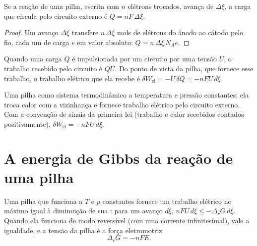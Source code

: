 \begin{proposition}\label{prop:b2:cell-thermodynamics:charge}
Se a reação de uma pilha, escrita com $n$ elétrons trocados, avança de
$\Delta\xi$, a carga que circula pelo circuito externo é $Q =
nF\,\Delta\xi$.
\end{proposition}

\begin{proof}
Um avanço $\Delta\xi$ transfere $n\,\Delta\xi$ mols de elétrons do ânodo ao
cátodo pelo fio, cada um de carga $e$ em valor absoluto:
$Q = n\,\Delta\xi\,N_A e$.
\end{proof}

Quando uma carga $Q$ é impulsionada por um circuito por uma tensão $U$, o
trabalho recebido pelo circuito é $QU$. Do ponto de vista da pilha, que
fornece esse trabalho, o trabalho elétrico que ela recebe é
$\delta W_{\text{el}} = -U\,\delta Q = -nFU\,
d\xi$.

\begin{omfigure}

{\small Uma pilha como sistema termodinâmico a temperatura e pressão
constantes: ela troca calor com a vizinhança e fornece trabalho elétrico pelo
circuito externo. Com a convenção de sinais da primeira lei (trabalho e calor
recebidos contados positivamente), $\delta W_{\text{el}} = -nFU\,d\xi$.}
\end{omfigure}

\section{A energia de Gibbs da reação de uma pilha}

\begin{theorem}\label{thm:b2:cell-thermodynamics:delta-g-nfe}
Uma pilha que funciona a $T$ e $p$ constantes fornece um trabalho elétrico no
máximo igual à diminuição de sua : para um avanço $d\xi$,
$nFU\,d\xi \leq -\Delta_r G\,d\xi$. Quando ela funciona de modo reversível
(com uma corrente infinitesimal), vale a igualdade, e a tensão da pilha é a
força eletromotriz
\[
  \Delta_r G = -nFE .
\]
\end{theorem}

